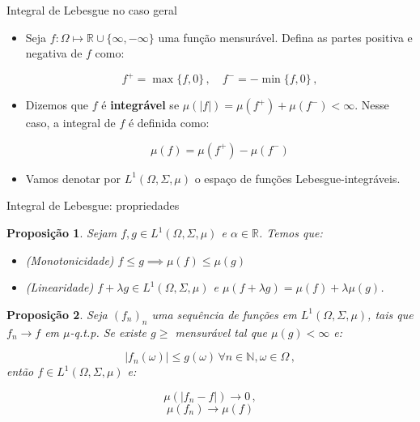 \documentclass[11pt]{beamer}
\newtheorem{proposition}{Proposição}
\begin{document}
	\begin{frame}{Integral de Lebesgue no caso geral}
	\begin{itemize}
		\item 		Seja $f:\Omega \mapsto \mathbb{R}\cup\{\infty,-\infty\}$ uma função mensurável. Defina as partes positiva e negativa de $f$ como:
		
		$$f^+ = \max\{f,0\} \,, \quad f^-  = - \min\{f,0\}\, ,$$
		

		\item Dizemos que $f$ é \textbf{integrável} se $\mu(|f|) = \mu(f^+) + \mu(f^-) < \infty$. Nesse caso, a integral de $f$ é definida como:
		
		$$\mu(f) = \mu(f^+)-\mu(f^-)$$
		
		\item Vamos denotar por $L^1(\Omega, \Sigma,\mu)$ o espaço de funções Lebesgue-integráveis.
		
	\end{itemize}
		
	\end{frame}
	\begin{frame}{Integral de Lebesgue: propriedades}
	\begin{proposition}
		Sejam $f,g \in L^1(\Omega,\Sigma, \mu)$ e $\alpha \in \mathbb{R}$. Temos que:
		\begin{itemize}
			\item[1] (Monotonicidade) $f \leq g \implies \mu(f)\leq \mu(g)$
			\item[2] (Linearidade) $f + \lambda g \in  L^1(\Omega,\Sigma, \mu)$ e $\mu(f+\lambda g) = \mu(f)+\lambda\mu(g)$.
		\end{itemize}
	\end{proposition}
	\begin{proposition}
		Seja $(f_n)_n$ uma sequência de funções em $ L^1(\Omega,\Sigma, \mu)$, tais que $f_n \to f$ em $\mu$-q.t.p. Se existe $g\geq $ mensurável  tal que $\mu(g) < \infty$ e:
		
		$$|f_n(\omega)|\leq g(\omega)\,  \forall n \in \mathbb{N}, \omega \in \Omega\, ,$$
		então  $f \in L^1(\Omega,\Sigma, \mu)$ e: 
		
		$$\mu(|f_n-f|)\to 0 \,,$$ $$ \mu(f_n) \to \mu(f)$$
	\end{proposition}
	\end{frame}
	
\end{document}
